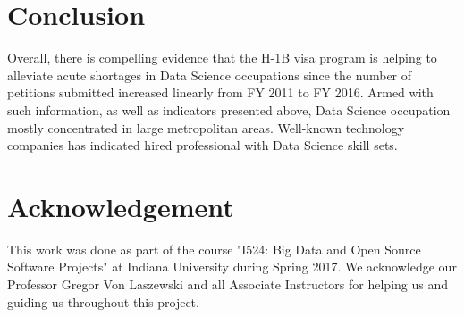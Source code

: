 \documentclass[9pt,twocolumn,twoside]{styles/osajnl}
\begin{document}
\section{Conclusion}

Overall, there is compelling evidence that the H-1B visa program is helping to alleviate acute shortages in Data Science occupations since the number of petitions submitted increased linearly from FY 2011 to FY 2016.  Armed with such information, as well as indicators presented above, Data Science occupation mostly concentrated in large metropolitan areas. Well-known technology companies has indicated hired professional with Data Science skill sets. 


\section{Acknowledgement}

This work was done as part of the course "I524: Big Data and Open Source Software Projects" at Indiana University during Spring 2017. We acknowledge our Professor Gregor Von Laszewski and all Associate Instructors for helping us and guiding us throughout this project.




\end{document}
